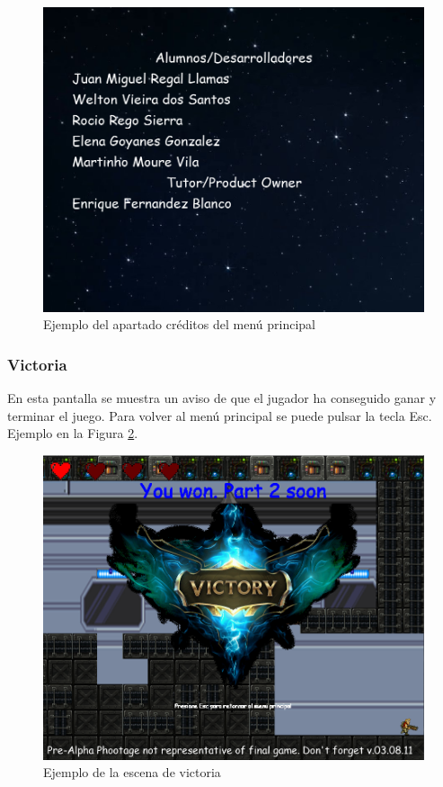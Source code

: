 \begin{figure}[H]
	\centering
	\includegraphics[scale=0.50]{imagenes/ApartadoCreditos.png}
	\caption{\label{fig:EjemploCreditos}Ejemplo del apartado créditos del menú principal}
\end{figure}

\subsubsection{Victoria}
En esta pantalla se muestra un aviso de que el jugador ha conseguido ganar y terminar el juego. Para volver al menú principal se puede pulsar la tecla Esc. Ejemplo en la Figura \ref{fig:EjemploVictoria}.

\begin{figure}[H]
	\centering
	\includegraphics[scale=0.50]{imagenes/victoria.png}
	\caption{\label{fig:EjemploVictoria}Ejemplo de la escena de victoria}
\end{figure}

